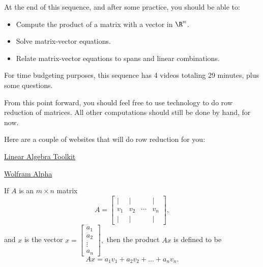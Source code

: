 







At the end of this sequence, and after some practice, you should be able to:

\begin{itemize}
\item Compute the product of a matrix with a vector in $\R^n$.   
\item Solve matrix-vector equations.
\item Relate matrix-vector equations to spans and linear combinations.  
\end{itemize}


For time budgeting purposes, this sequence has 4 videos totaling 29 minutes, 
plus some questions.  




\endedxtext

\endedxvertical



From this point forward, you should feel free to use technology to do row reduction of matrices.  All other
computations should still be done by hand, for now.  

Here are a couple of websites that will do row reduction for you:

\href{https://tinyurl.com/3xr6ed}{Linear Algebra Toolkit}

\href{https://www.wolframalpha.com/}{Wolfram Alpha}


\endedxtext

\endedxvertical





If $A$ is an $m\times n$ matrix
\[ A = \left[ \begin{array}{cccc} | & | & & | \\ 
v_1 & v_2 & \cdots & v_n \\
 | & | & & | \end{array} \right], \] and $x$ is the vector $x = \left[\begin{array}{c} a_1 \\ a_2 \\ \vdots \\ a_n
\end{array} \right],$ then 
the product $Ax$ is defined to be 
\[ Ax = a_1 v_1 + a_2 v_2 + \ldots + a_n v_n.\]



